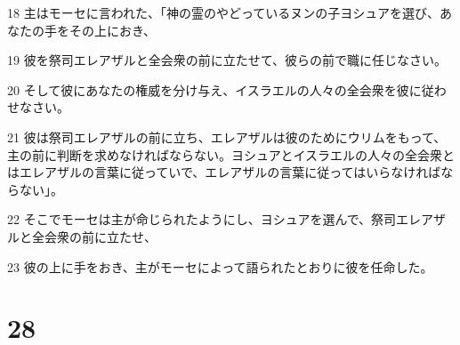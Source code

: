 \par 18 主はモーセに言われた、「神の霊のやどっているヌンの子ヨシュアを選び、あなたの手をその上におき、
\par 19 彼を祭司エレアザルと全会衆の前に立たせて、彼らの前で職に任じなさい。
\par 20 そして彼にあなたの権威を分け与え、イスラエルの人々の全会衆を彼に従わせなさい。
\par 21 彼は祭司エレアザルの前に立ち、エレアザルは彼のためにウリムをもって、主の前に判断を求めなければならない。ヨシュアとイスラエルの人々の全会衆とはエレアザルの言葉に従っていで、エレアザルの言葉に従ってはいらなければならない」。
\par 22 そこでモーセは主が命じられたようにし、ヨシュアを選んで、祭司エレアザルと全会衆の前に立たせ、
\par 23 彼の上に手をおき、主がモーセによって語られたとおりに彼を任命した。

\chapter{28}

